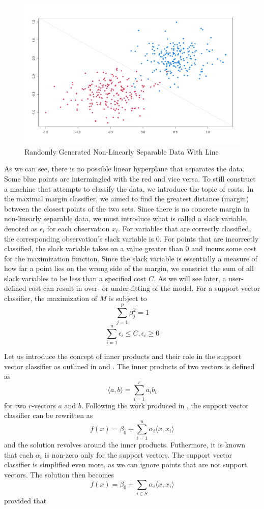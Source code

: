 \documentclass[12pt]{article}
\begin{document}
\begin{figure}
    \centering
    \includegraphics[width=5in]{Figures/svc/svc_randomly_generated_w_line.png}
    \caption{Randomly Generated Non-Linearly Separable Data With Line}
    \label{fig_svc_randomly_generated_w_line}
\end{figure}

As we can see, there is no possible linear hyperplane that separates the data. Some blue points are intermingled with the red and vice versa. To still construct a machine that attempts to classify the data, we introduce the topic of costs. In the maximal margin classifier, we aimed to find the greatest distance (margin) between the closest points of the two sets. Since there is no concrete margin in non-linearly separable data, we must introduce what is called a slack variable, denoted as $\epsilon_i$ for each observation $x_i$. For variables that are correctly classified, the corresponding observation's slack variable is 0. For points that are incorrectly classified, the slack variable takes on a value greater than 0 and incurs some cost for the maximization function. Since the slack variable is essentially a measure of how far a point lies on the wrong side of the margin, we constrict the sum of all slack variables to be less than a specified cost $C$. As we will see later, a user-defined cost can result in over- or under-fitting of the model. For a support vector classifier, the maximization of \(M\) is subject to \[ \sum_{j=1}^{p} \beta^2_j=1 \] \[ \sum_{i=1}^{n} \epsilon_i \le C, \epsilon_i \ge 0 \]

Let us introduce the concept of inner products and their role in the support vector classifier as outlined in \citep{introstatlearning} and \citep{esl2}. The inner products of two vectors is defined as \[ \langle a,b \rangle=\sum_{i=1}^{r}a_ib_i \] for two \(r\)-vectors \(a\) and \(b\). Following the work produced in \citep{introstatlearning}, the support vector classifier can be rewritten as \[f(x) = \beta_0 + \sum_{i=1}^n \alpha_i \langle x,x_i \rangle \] and the solution revolves around the inner products. Futhermore, it is known that each \(\alpha_i\) is non-zero only for the support vectors. The support vector classifier is simplified even more, as we can ignore points that are not support vectors. The solution then becomes \[f(x) = \beta_0 + \sum_{i \in S} \alpha_i \langle x,x_i \rangle \] provided that
\end{document}
